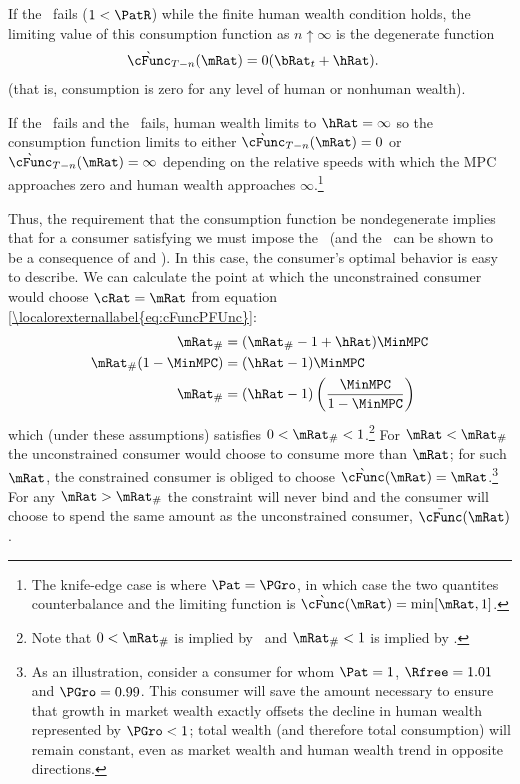 \documentclass[\econtexRoot/BufferStockTheory.tex]{subfiles}
\begin{document}
If the \RIC~fails ($1 < \PatR$) while the finite human wealth condition
holds, the limiting value of this consumption function as $n \uparrow
\infty$ is the degenerate function
\begin{align}
  \grave{\cFunc}_{T-n}(\mRat)  & = 0 (\bRat_{t}+\hRat).
\end{align}
(that is, consumption is zero for any level of human or nonhuman wealth).

If the \RIC~fails and the \FHWC~fails, human wealth limits to $\hRat =
\infty$ so the consumption function limits to either
$\grave{\cFunc}_{T-n}(\mRat) = 0$ or
$\grave{\cFunc}_{T-n}(\mRat) = \infty$ depending on the relative
speeds with which the MPC approaches zero and human wealth approaches
$\infty$.\footnote{The knife-edge case is where $\Pat = \PGro$, in
  which case the two quantites counterbalance and the limiting
  function is $\grave{\cFunc}(\mRat)=\min[\mRat,1]$.}

\let\TableWidth\relax
\newlength\TableWidth

Thus, the requirement that the consumption function be nondegenerate
implies that for a consumer satisfying \cncl{\PFGIC} we must impose
the \RIC~(and the \FHWC~can be shown to be a consequence of \cncl{\PFGIC} and \RIC).  In
this case, the consumer's optimal behavior is easy to describe.  We
can calculate the point at which the unconstrained consumer would
choose $\cRat = \mRat$ from equation \eqref{\localorexternallabel{eq:cFuncPFUnc}}:
\begin{align}
  \mRat_{\#}  & = (\mRat_{\#}-1+\hRat)\MinMPC
\\ \mRat_{\#}(1-\MinMPC)  & = (\hRat - 1)\MinMPC
\\ \mRat_{\#}  & = (\hRat - 1)\left(\frac{\MinMPC}{1-\MinMPC}\right)
\end{align}
which (under these assumptions) satisfies $0 < \mRat_{\#} < 1$.\footnote{Note that $0 < \mRat_{\#}$ is implied by \RIC~and $ \mRat_{\#}<1$ is implied by \cncl{\PFGIC}.}  For
$\mRat < \mRat_{\#}$ the unconstrained consumer would choose to
consume more than $\mRat$; for such $\mRat$, the constrained consumer
is obliged to choose $\grave{\cFunc}(\mRat) = \mRat$.\footnote{As an
  illustration, consider a consumer for whom $\Pat = 1$, $\Rfree
  =1.01$ and $\PGro = 0.99$.  This consumer will save the amount
  necessary to ensure that growth in market wealth exactly offsets the
  decline in human wealth represented by $\PGro < 1$; total wealth
  (and therefore total consumption) will remain constant, even as
  market wealth and human wealth trend in opposite directions.}  For
any $\mRat > \mRat_{\#}$ the constraint will never bind and the
consumer will choose to spend the same amount as the unconstrained
consumer, $\bar{\cFunc}(\mRat)$.
\end{document}
